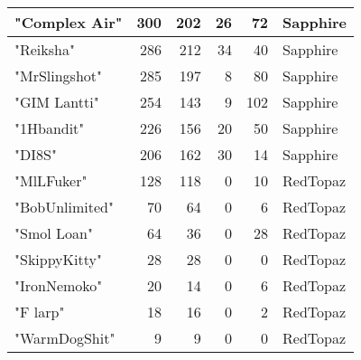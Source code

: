 \documentclass{article}
\begin{document}
\begin{table}[htbp]
\begin{tabular}{|l|r|r|r|r|l|}
"Complex Air" & 300 & 202 & 26 & 72 & Sapphire \\ \hline
"Reiksha" & 286 & 212 & 34 & 40 & Sapphire \\ \hline
"MrSlingshot" & 285 & 197 & 8 & 80 & Sapphire \\ \hline
"GIM Lantti" & 254 & 143 & 9 & 102 & Sapphire \\ \hline
"1Hbandit" & 226 & 156 & 20 & 50 & Sapphire \\ \hline
"DI8S" & 206 & 162 & 30 & 14 & Sapphire \\ \hline
"MlLFuker" & 128 & 118 & 0 & 10 & RedTopaz \\ \hline
"BobUnlimited" & 70 & 64 & 0 & 6 & RedTopaz \\ \hline
"Smol Loan" & 64 & 36 & 0 & 28 & RedTopaz \\ \hline
"SkippyKitty" & 28 & 28 & 0 & 0 & RedTopaz \\ \hline
"IronNemoko" & 20 & 14 & 0 & 6 & RedTopaz \\ \hline
"F larp" & 18 & 16 & 0 & 2 & RedTopaz \\ \hline
"WarmDogShit" & 9 & 9 & 0 & 0 & RedTopaz \\ \hline
\end{tabular}
\end{table}
\end{document}
